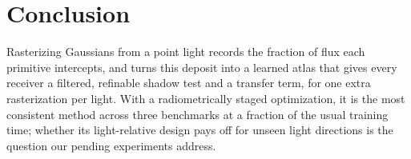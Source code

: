 \section{Conclusion}
\label{sec:conclusion}

Rasterizing Gaussians from a point light records the fraction of flux each primitive intercepts, and \ours turns this deposit into a learned atlas that gives every receiver a filtered, refinable shadow test and a transfer term, for one extra rasterization per light.
With a radiometrically staged optimization, it is the most consistent method across three benchmarks at a fraction of the usual training time; whether its light-relative design pays off for unseen light directions is the question our pending experiments address.
